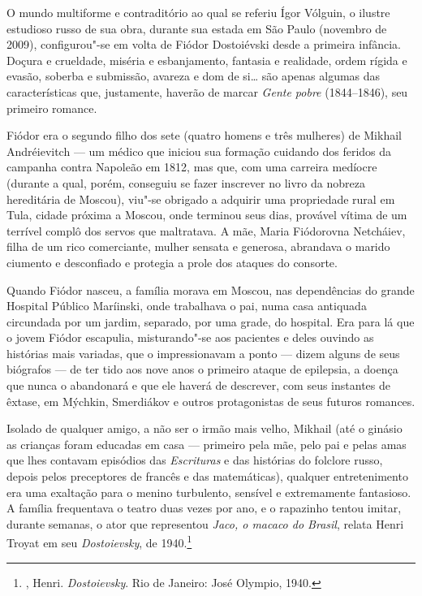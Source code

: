 O mundo multiforme e contraditório ao qual se referiu
Ígor Vólguin, o ilustre estudioso russo de sua obra, durante sua
estada em São Paulo (novembro de 2009), configurou"-se em volta
de Fiódor Dostoiévski desde a primeira infância. Doçura e
crueldade, miséria e esbanjamento, fantasia e realidade,
ordem rígida e evasão, soberba e submissão, avareza e dom
de si\ldots{} são apenas algumas das características que,
justamente, haverão de marcar \emph{Gente pobre} (1844--1846),
seu primeiro romance.

Fiódor era o segundo filho dos sete (quatro homens e três
mulheres) de Mikhail Andréievitch --- um médico que iniciou
sua formação cuidando dos feridos da campanha contra Napoleão
em 1812, mas que, com uma carreira medíocre (durante a qual,
porém, conseguiu se fazer inscrever no livro da nobreza
hereditária de Moscou), viu"-se obrigado a adquirir uma propriedade rural
em Tula, cidade próxima a Moscou, onde terminou seus dias,
provável vítima de um terrível complô dos servos que
maltratava. A mãe, Maria Fiódorovna Netcháiev, filha de um
rico comerciante, mulher sensata e generosa, abrandava o
marido ciumento e desconfiado e protegia a prole dos ataques do
consorte.

Quando Fiódor nasceu, a família morava em Moscou, nas dependências
do grande Hospital Público Maríinski, onde trabalhava o pai, numa
casa antiquada circundada por um jardim, separado, por uma grade,
do hospital. Era para lá que o jovem Fiódor escapulia,
misturando"-se aos pacientes e deles ouvindo as histórias mais
variadas, que o impressionavam a ponto --- dizem alguns de seus
biógrafos --- de ter tido aos nove anos o primeiro ataque de
epilepsia, a doença que nunca o abandonará e que ele haverá
de descrever, com seus instantes de êxtase, em Mýchkin,
Smerdiákov e outros protagonistas de seus futuros romances.

Isolado de qualquer amigo, a não ser o irmão mais velho, Mikhail
(até o ginásio as crianças foram educadas em casa --- primeiro
pela mãe, pelo pai e pelas amas que lhes contavam episódios das
\emph{Escrituras} e das histórias do folclore russo, depois pelos
preceptores de francês e das matemáticas), qualquer entretenimento
era uma exaltação para o menino turbulento, sensível e extremamente fantasioso. A família frequentava o teatro duas vezes por ano, e o rapazinho tentou imitar, durante semanas, o ator que representou \emph{Jaco, o
macaco do Brasil}, relata Henri Troyat em seu \emph{Dostoievsky},
de 1940.\footnote{, Henri. \emph{Dostoievsky}.
Rio de Janeiro: José Olympio, 1940.}

